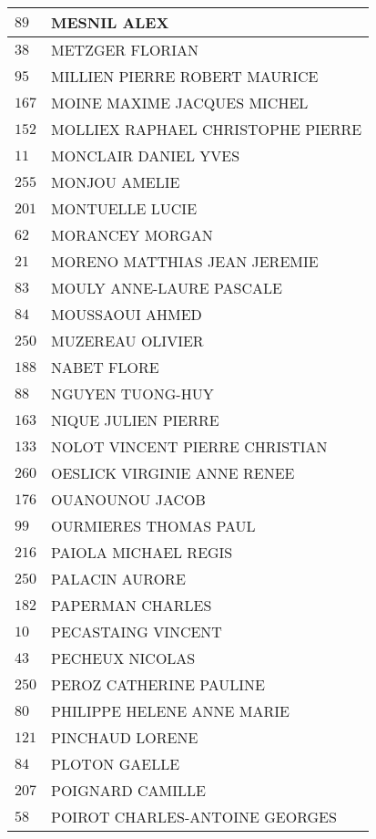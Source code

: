 \begin{xltabular}{\linewidth}{|l|X|}
    \hline
    $89$ & MESNIL ALEX \\
    \hline
    $38$ & METZGER FLORIAN \\
    \hline
    $95$ & MILLIEN PIERRE ROBERT MAURICE \\
    \hline
    $167$ & MOINE MAXIME JACQUES MICHEL \\
    \hline
    $152$ & MOLLIEX RAPHAEL CHRISTOPHE PIERRE \\
    \hline
    $11$ & MONCLAIR DANIEL YVES \\
    \hline
    $255$ & MONJOU AMELIE \\
    \hline
    $201$ & MONTUELLE LUCIE \\
    \hline
    $62$ & MORANCEY MORGAN \\
    \hline
    $21$ & MORENO MATTHIAS JEAN JEREMIE \\
    \hline
    $83$ & MOULY ANNE-LAURE PASCALE \\
    \hline
    $84$ & MOUSSAOUI AHMED \\
    \hline
    $250$ & MUZEREAU OLIVIER \\
    \hline
    $188$ & NABET FLORE \\
    \hline
    $88$ & NGUYEN TUONG-HUY \\
    \hline
    $163$ & NIQUE JULIEN PIERRE \\
    \hline
    $133$ & NOLOT VINCENT PIERRE CHRISTIAN \\
    \hline
    $260$ & OESLICK VIRGINIE ANNE RENEE \\
    \hline
    $176$ & OUANOUNOU JACOB \\
    \hline
    $99$ & OURMIERES THOMAS PAUL \\
    \hline
    $216$ & PAIOLA MICHAEL REGIS \\
    \hline
    $250$ & PALACIN AURORE \\
    \hline
    $182$ & PAPERMAN CHARLES \\
    \hline
    $10$ & PECASTAING VINCENT \\
    \hline
    $43$ & PECHEUX NICOLAS \\
    \hline
    $250$ & PEROZ CATHERINE PAULINE \\
    \hline
    $80$ & PHILIPPE HELENE ANNE MARIE \\
    \hline
    $121$ & PINCHAUD LORENE \\
    \hline
    $84$ & PLOTON GAELLE \\
    \hline
    $207$ & POIGNARD CAMILLE \\
    \hline
    $58$ & POIROT CHARLES-ANTOINE GEORGES \\

\end{xltabular}
